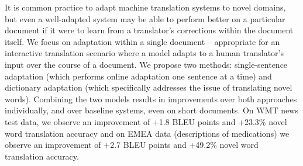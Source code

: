 It is common practice to adapt machine translation systems to novel domains, but even a well-adapted system may be able to perform better on a particular document if it were to learn from a translator's corrections within the document itself. We focus on adaptation within a single document -- appropriate for an interactive translation scenario where a model adapts to a human translator's input over the course of a document. We propose two methods: single-sentence adaptation (which performs online adaptation one sentence at a time) and dictionary adaptation (which specifically addresses the issue of translating novel words). Combining the two models results in improvements over both approaches individually, and over baseline systems, even on short documents. On WMT news test data, we observe an improvement of +1.8 BLEU points and +23.3\% novel word translation accuracy and on EMEA data (descriptions of medications) we observe an improvement of +2.7 BLEU points and +49.2\% novel word translation accuracy.
